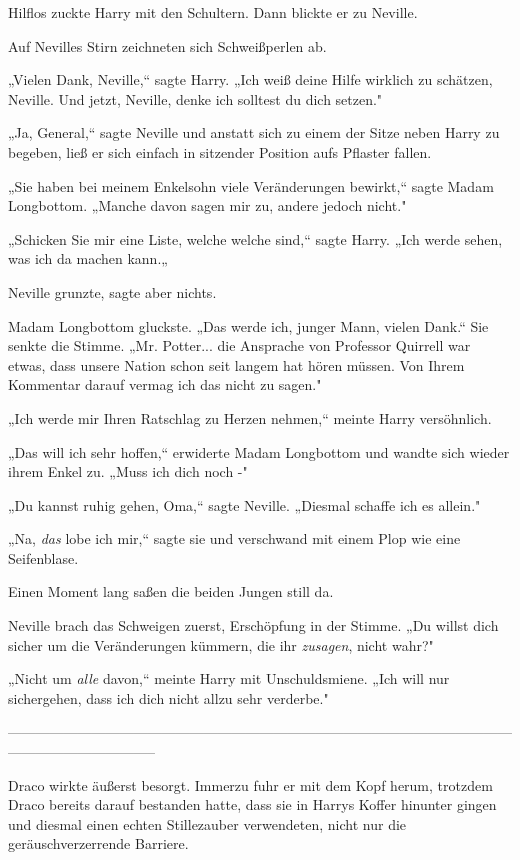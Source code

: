 {Hilflos zuckte Harry mit den Schultern. Dann blickte er zu Neville.

Auf Nevilles Stirn zeichneten sich Schweißperlen ab.

„Vielen Dank, Neville,“ sagte Harry. „Ich weiß deine Hilfe wirklich zu schätzen, Neville. Und jetzt, Neville, denke ich solltest du dich setzen."

„Ja, General,“ sagte Neville und anstatt sich zu einem der Sitze neben Harry zu begeben, ließ er sich einfach in sitzender Position aufs Pflaster fallen.

„Sie haben bei meinem Enkelsohn viele Veränderungen bewirkt,“ sagte Madam Longbottom. „Manche davon sagen mir zu, andere jedoch nicht."

„Schicken Sie mir eine Liste, welche welche sind,“ sagte Harry. „Ich werde sehen, was ich da machen kann.„

Neville grunzte, sagte aber nichts.

Madam Longbottom gluckste. „Das werde ich, junger Mann, vielen Dank.“ Sie senkte die Stimme. „Mr. Potter... die Ansprache von Professor Quirrell war etwas, dass unsere Nation schon seit langem hat hören müssen. Von Ihrem Kommentar darauf vermag ich das nicht zu sagen."

„Ich werde mir Ihren Ratschlag zu Herzen nehmen,“ meinte Harry versöhnlich.

„Das will ich sehr hoffen,“ erwiderte Madam Longbottom und wandte sich wieder ihrem Enkel zu. „Muss ich dich noch -"

„Du kannst ruhig gehen, Oma,“ sagte Neville. „Diesmal schaffe ich es allein."

„Na, \emph{das} lobe ich mir,“ sagte sie und verschwand mit einem Plop wie eine Seifenblase.

Einen Moment lang saßen die beiden Jungen still da.

Neville brach das Schweigen zuerst, Erschöpfung in der Stimme. „Du willst dich sicher um die Veränderungen kümmern, die ihr \emph{zusagen}, nicht wahr?"

„Nicht um \emph{alle} davon,“ meinte Harry mit Unschuldsmiene. „Ich will nur sichergehen, dass ich dich nicht allzu sehr verderbe."

--------------------------------------------------------------------------------------------------------------------------------------------

\hfill\break Draco wirkte äußerst besorgt. Immerzu fuhr er mit dem Kopf herum, trotzdem Draco bereits darauf bestanden hatte, dass sie in Harrys Koffer hinunter gingen und diesmal einen echten Stillezauber verwendeten, nicht nur die geräuschverzerrende Barriere.

}
